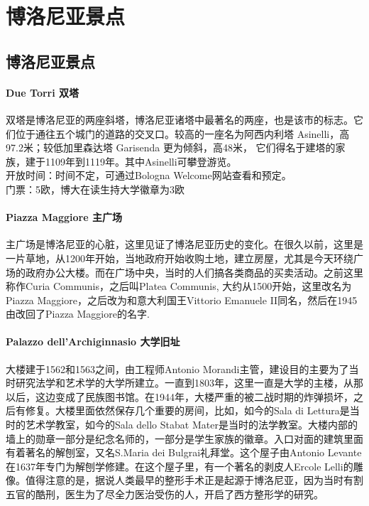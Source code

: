 \chapter{博洛尼亚景点}              


\section{博洛尼亚景点}

\subsubsection{Due Torri 双塔}
双塔是博洛尼亚的两座斜塔，博洛尼亚诸塔中最著名的两座，也是该市的标志。它们位于通往五个城门的道路的交叉口。较高的一座名为阿西内利塔 Asinelli，高97.2米；较低加里森达塔 Garisenda 更为倾斜，高48米， 它们得名于建塔的家族，建于1109年到1119年。其中Asinelli可攀登游览。\\
开放时间：时间不定，可通过Bologna Welcome网站查看和预定。\\
门票：5欧，博大在读生持大学徽章为3欧


\subsubsection{Piazza Maggiore 主广场}
主广场是博洛尼亚的心脏，这里见证了博洛尼亚历史的变化。在很久以前，这里是一片草地，从1200年开始，当地政府开始收购土地，建立房屋，尤其是今天环绕广场的政府办公大楼。而在广场中央，当时的人们搞各类商品的买卖活动。之前这里称作Curia Communis，之后叫Platea Communis, 大约从1500开始，这里改名为Piazza Maggiore，之后改为和意大利国王Vittorio Emanuele II同名，然后在1945由改回了Piazza Maggiore的名字.
 
\subsubsection{Palazzo dell'Archiginnasio 大学旧址}
大楼建于1562和1563之间，由工程师Antonio Morandi主管，建设目的主要为了当时研究法学和艺术学的大学所建立。一直到1803年，这里一直是大学的主楼，从那以后，这边变成了民族图书馆。在1944年，大楼严重的被二战时期的炸弹损坏，之后有修复。大楼里面依然保存几个重要的房间，比如，如今的Sala di Lettura是当时的艺术学教室，如今的Sala dello Stabat Mater是当时的法学教室。大楼内部的墙上的勋章一部分是纪念名师的，一部分是学生家族的徽章。入口对面的建筑里面有着著名的解刨室，又名S.Maria dei Bulgrai礼拜堂。这个屋子由Antonio Levante在1637年专门为解刨学修建。在这个屋子里，有一个著名的剥皮人Ercole Lelli的雕像。值得注意的是，据说人类最早的整形手术正是起源于博洛尼亚，因为当时有割五官的酷刑，医生为了尽全力医治受伤的人，开启了西方整形学的研究。


